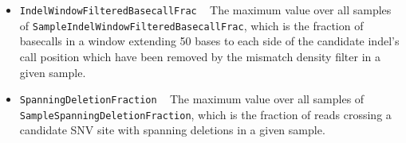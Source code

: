 \documentclass{article}
\begin{document}
\begin{itemize}
    \item \texttt{IndelWindowFilteredBasecallFrac} ~ The maximum value over all samples of \texttt{SampleIndelWindowFilteredBasecallFrac}, which is the fraction of basecalls in a window extending 50 bases to each side of the candidate indel's call position which have been removed by the mismatch density filter in a given sample.

    \item \texttt{SpanningDeletionFraction} ~ The maximum value over all samples of \texttt{SampleSpanningDeletionFraction}, which is the fraction of reads crossing a candidate SNV site with spanning deletions in a given sample.
\end{itemize}



\end{document}
